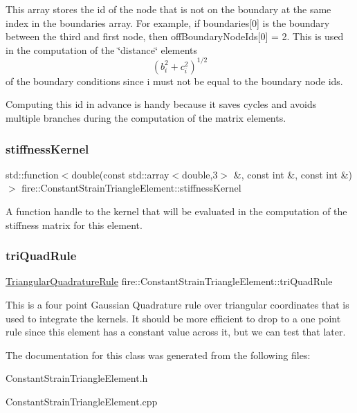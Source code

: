 This array stores the id of the node that is not on the boundary at the same index in the boundaries array. For example, if boundaries\mbox{[}0\mbox{]} is the boundary between the third and first node, then off\+Boundary\+Node\+Ids\mbox{[}0\mbox{]} = 2. This is used in the computation of the \char`\"{}distance\char`\"{} elements \[ (b_{i}^{2} + c_{i}^{2})^{1/2} \] of the boundary conditions since i must not be equal to the boundary node ids.

Computing this id in advance is handy because it saves cycles and avoids multiple branches during the computation of the matrix elements. \mbox{\label{a00770_ae2480b5335fe78245cb1006e3eeb034d}} 
\subsubsection{\texorpdfstring{stiffness\+Kernel}{stiffnessKernel}}
{\footnotesize\ttfamily std\+::function$<$double(const std\+::array$<$double,3$>$ \&, const int \&, const int \&)$>$ fire\+::\+Constant\+Strain\+Triangle\+Element\+::stiffness\+Kernel\hspace{0.3cm}{\ttfamily [protected]}}

A function handle to the kernel that will be evaluated in the computation of the stiffness matrix for this element. \mbox{\label{a00770_a5e50303ae2cfb783f44de143be8a9aac}} 
\subsubsection{\texorpdfstring{tri\+Quad\+Rule}{triQuadRule}}
{\footnotesize\ttfamily \hyperlink{a00866}{Triangular\+Quadrature\+Rule} fire\+::\+Constant\+Strain\+Triangle\+Element\+::tri\+Quad\+Rule\hspace{0.3cm}{\ttfamily [protected]}}

This is a four point Gaussian Quadrature rule over triangular coordinates that is used to integrate the kernels. It should be more efficient to drop to a one point rule since this element has a constant value across it, but we can test that later. 

The documentation for this class was generated from the following files\+:\begin{DoxyCompactItemize}
\item 
Constant\+Strain\+Triangle\+Element.\+h\item 
Constant\+Strain\+Triangle\+Element.\+cpp\end{DoxyCompactItemize}

